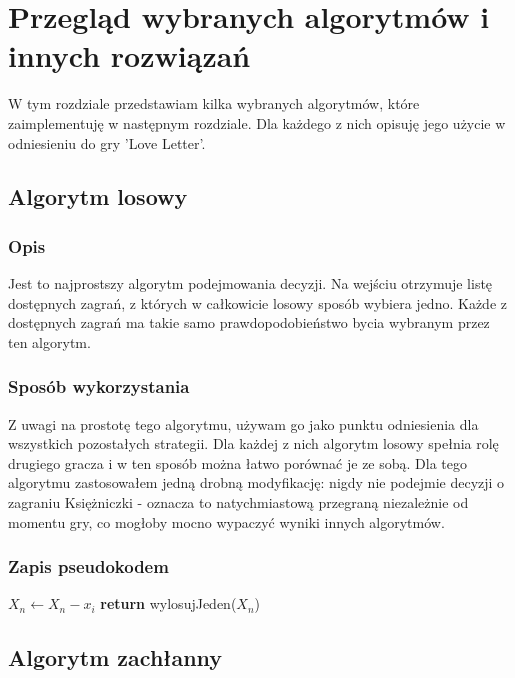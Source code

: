 \chapter{Przegląd wybranych algorytmów i innych rozwiązań}
\label{cha:rozdz3}

W tym rozdziale przedstawiam kilka wybranych algorytmów, które zaimplementuję w następnym rozdziale. Dla każdego z nich opisuję jego użycie w odniesieniu do gry 'Love Letter'.

\section{Algorytm losowy}
\label{sec:algLos}
\subsection{Opis}
Jest to najprostszy algorytm podejmowania decyzji. Na wejściu otrzymuje listę dostępnych zagrań, z których w całkowicie losowy sposób wybiera jedno. Każde z dostępnych zagrań ma takie samo prawdopodobieństwo bycia wybranym przez ten algorytm.

\subsection{Sposób wykorzystania}
Z uwagi na prostotę tego algorytmu, używam go jako punktu odniesienia dla wszystkich pozostałych strategii. Dla każdej z nich algorytm losowy spełnia rolę drugiego gracza i w ten sposób można łatwo porównać je ze sobą. Dla tego algorytmu zastosowałem jedną drobną modyfikację: nigdy nie podejmie decyzji o zagraniu Księżniczki - oznacza to natychmiastową przegraną niezależnie od momentu gry, co mogłoby mocno wypaczyć wyniki innych algorytmów.

\subsection{Zapis pseudokodem}
\begin{algorithmic}[1]
				\State $X_n \gets X_n - x_i$
			\EndIf
		\EndFor
	\State \textbf{return} wylosujJeden($X_n$) 
	\EndFunction
\end{algorithmic}

\section{Algorytm zachłanny}
\label{sec:algZach}
